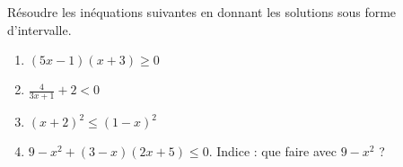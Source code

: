 
\begin{exercice}\label{exosmath-0325}

    Résoudre les inéquations suivantes en donnant les solutions sous forme d'intervalle.
    \begin{enumerate}
        \item
            \( (5x-1)(x+3)\geq 0\)
        \item
            \( \frac{ 4 }{ 3x+1 }+2<0\)
        \item
            \( (x+2)^2\leq (1-x)^2\)
        \item
            \( 9-x^2+(3-x)(2x+5)\leq 0\). Indice : que faire avec \( 9-x^2\) ?
    \end{enumerate}

\end{exercice}
